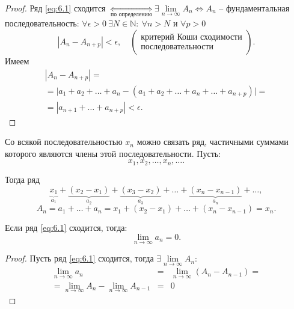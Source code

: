 \begin{proof}
    Ряд \ref{eq:6.1} сходится $\underset{\text{по определению}}{\iff} \exists \underset{n\rightarrow\infty}{\lim}A_n \iff A_n$ -- фундаментальная последовательность: $\forall \epsilon > 0 \ \exists N \in \mathbb{N}: \ \forall n > N$ и $\forall p > 0$
    \[
        |A_n - A_{n+p}| < \epsilon, \quad \left(\begin{array}{c}
                \text{критерий Коши сходимости} \\
                \text{последовательности}
            \end{array}\right).
    \]
    Имеем
    \begin{multline*}
        |A_n - A_{n+p}| = \\
        =\big|a_1 + a_2 + \ldots + a_n - (a_1 + a_2 + \ldots + a_n + \ldots + a_{n+p})\big| = \\
        = |a_{n+1} + \ldots + a_{n+p}| < \epsilon.
    \end{multline*}
\end{proof}

\begin{remark}
    Со всякой последовательностью $x_n$ можно связать ряд, частичными суммами которого являются члены этой последовательности. Пусть:
    \[
        x_1,x_2,\ldots,x_n,\ldots.
    \]

    Тогда ряд
    \[
        \underbrace{x_1}_{a_1} + \underbrace{(x_2 - x_1)}_{a_2} + \underbrace{(x_3 - x_2)}_{a_3} + \ldots + \underbrace{(x_n - x_{n-1})}_{a_n} + \ldots,
    \]
    \[
        A_n = a_1 + \ldots + a_n = x_1 + (x_2 - x_1) + \ldots + (x_n - x_{n-1}) = x_n.
    \]
\end{remark}

\begin{theorem}
    Если ряд \ref{eq:6.1} сходится, тогда:
    \[
        \underset{n\rightarrow\infty}{\lim}a_n = 0.
    \]
\end{theorem}

\begin{proof}
    Пусть ряд \ref{eq:6.1} сходится, тогда $\exists \underset{n\rightarrow\infty}{\lim}A_n$:
    \begin{eqnarray*}
        \underset{n\rightarrow\infty}{\lim}a_n &=& \underset{n\rightarrow\infty}{\lim}(A_n - A_{n-1}) = \\
        = \underset{n\rightarrow\infty}{\lim}A_n - \underset{n\rightarrow\infty}{\lim}A_{n-1} &=& 0
    \end{eqnarray*}
\end{proof}